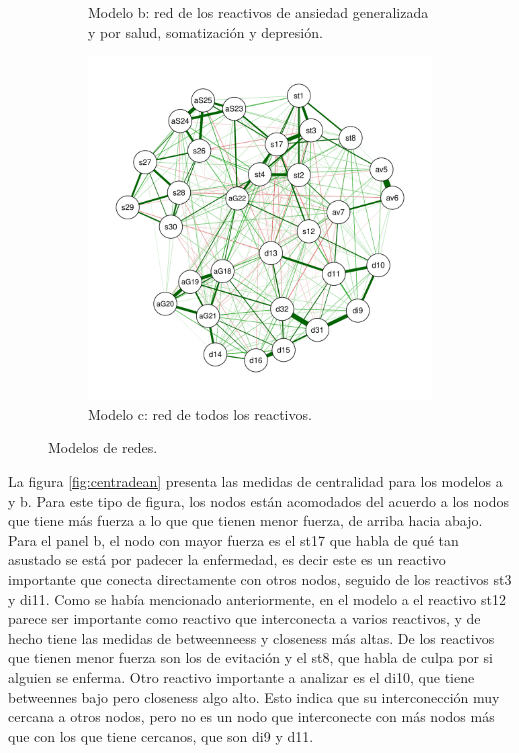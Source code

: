 \documentclass[11pt,spanish]{article}\usepackage[]{graphicx}\usepackage[]{color}
\begin{document}
\begin{figure}
\begin{subfigure}{0.45\textwidth}
    \caption{Modelo b: red de los reactivos de ansiedad generalizada y por salud, somatización y depresión.}
    \label{fig:netdean}
\end{subfigure}
\hfill
\begin{subfigure}{0.7\textwidth}
    \includegraphics[width=\textwidth]{images/net_todo.pdf}
    \caption{Modelo c: red de todos los reactivos.}
    \label{fig:nettodos}
\end{subfigure}
\caption{Modelos de redes.}
\label{fig:nets}
\end{figure}

\newpage

La figura \ref{fig:centradean} presenta las medidas de centralidad para los modelos a y b. Para este tipo de figura, los nodos están acomodados del acuerdo a los nodos que tiene más fuerza a lo que que tienen menor fuerza, de arriba hacia abajo. Para el panel b, el nodo con mayor fuerza es el st17 que habla de qué tan asustado se está por padecer la enfermedad, es decir este es un reactivo importante que conecta directamente con otros nodos, seguido de los reactivos st3 y di11. Como se había mencionado anteriormente, en el modelo a el reactivo st12 parece ser importante como reactivo que interconecta a varios reactivos, y de hecho tiene las medidas de betweenneess y closeness más altas. De los reactivos que tienen menor fuerza son los de evitación y el st8, que habla de culpa por si alguien se enferma. Otro reactivo importante a analizar es el di10, que tiene betweennes bajo pero closeness algo alto. Esto indica que su interconección muy cercana a otros nodos, pero no es un nodo que interconecte con más nodos más que con los que tiene cercanos, que son di9 y d11.
\end{document}
